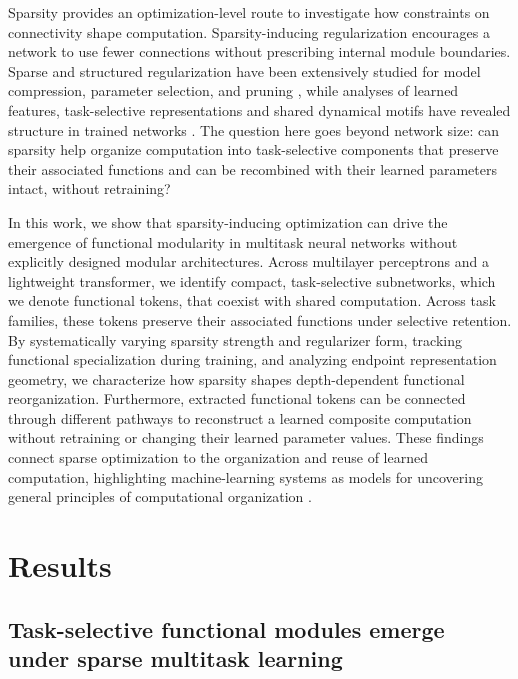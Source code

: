 \documentclass{article}
\begin{document}
Sparsity provides an optimization-level route to investigate how constraints on connectivity shape computation. Sparsity-inducing regularization encourages a network to use fewer connections without prescribing internal module boundaries. Sparse and structured regularization have been extensively studied for model compression, parameter selection, and pruning \cite{wenLearningStructuredSparsity2016,scardapaneGroupSparseRegularization2017,maTransformed1Regularization2019}, while analyses of learned features, task-selective representations and shared dynamical motifs have revealed structure in trained networks \cite{agrawalWeightScaleInterpretingWeight2022,liGeometryConceptsSparse2024,michaudOpeningAIBlack2024,yangTaskRepresentationsNeural2019,driscollFlexibleMultitaskComputation2024}. The question here goes beyond network size: can sparsity help organize computation into task-selective components that preserve their associated functions and can be recombined with their learned parameters intact, without retraining?

In this work, we show that sparsity-inducing optimization can drive the emergence of functional modularity in multitask neural networks without explicitly designed modular architectures. Across multilayer perceptrons and a lightweight transformer, we identify compact, task-selective subnetworks, which we denote functional tokens, that coexist with shared computation. Across task families, these tokens preserve their associated functions under selective retention. By systematically varying sparsity strength and regularizer form, tracking functional specialization during training, and analyzing endpoint representation geometry, we characterize how sparsity shapes depth-dependent functional reorganization. Furthermore, extracted functional tokens can be connected through different pathways to reconstruct a learned composite computation without retraining or changing their learned parameter values. These findings connect sparse optimization to the organization and reuse of learned computation, highlighting machine-learning systems as models for uncovering general principles of computational organization \cite{levineMachineLearningMeets2024}.

\section{Results}

\subsection{Task-selective functional modules emerge under sparse multitask learning}
\end{document}
